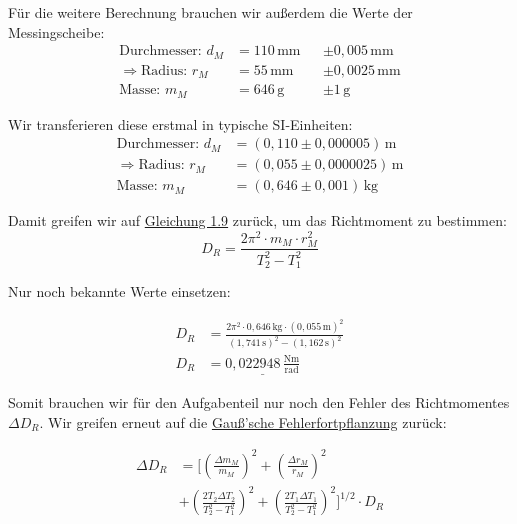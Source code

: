 Für die weitere Berechnung brauchen wir außerdem die Werte der Messingscheibe:
\begin{align*}
    \text{Durchmesser: }         d_M   &= 110\,\mathrm{mm}    &&\pm 0,005\,\mathrm{mm} \\
    \Rightarrow \text{Radius: }  r_M   &= 55\,\mathrm{mm}     &&\pm 0,0025\,\mathrm{mm} \\
    \text{Masse: }               m_M   &= 646\,\mathrm{g}     &&\pm 1\,\mathrm{g}
\end{align*}

Wir transferieren diese erstmal in typische SI-Einheiten:
\begin{align*}
    \text{Durchmesser: }         d_M   &= (0,110 \pm 0,000005)\,\mathrm{m} \\
    \Rightarrow \text{Radius: }  r_M   &= (0,055  \pm 0,0000025)\,\mathrm{m} \\
    \text{Masse: }               m_M   &= (0,646 \pm 0,001)\,\mathrm{kg}
\end{align*}

Damit greifen wir auf \hyperref[eq:richtmoment_rechnen]{Gleichung 1.9} zurück, um das Richtmoment zu bestimmen:
\begin{equation}
    D_R = \frac{2\pi^2 \cdot m_M \cdot r_M^2}{T_2^2-T_1^2}
\end{equation}

Nur noch bekannte Werte einsetzen:

\begin{align}
    D_R &= \frac{2\pi^2 \cdot 0,646\,\mathrm{kg} \cdot (0,055\,\mathrm{m})^2}{(1,741\,\mathrm{s})^2-(1,162\,\mathrm{s})^2} \\
    D_R &= \underline{0,022948 \,\mathrm{\frac{Nm}{rad}}}
    \label{eq:richtmoment_berechnet}
\end{align}

Somit brauchen wir für den Aufgabenteil nur noch den Fehler des Richtmomentes $\Delta D_R$. Wir greifen erneut auf die \hyperref[eq:gauss_fehlfortpflanzung]{Gauß'sche Fehlerfortpflanzung} zurück:

\begin{equation}
    \begin{split}
    \Delta D_R &= \Bigg[ 
    \left(\frac{\Delta m_M}{m_M}\right)^2 + 
    \left(\frac{\Delta r_M}{r_M}\right)^2 \\[6pt]
    &+ \left(\frac{2T_2 \Delta T_2}{T_2^2-T_1^2}\right)^2 
    + \left(\frac{2T_1 \Delta T_1}{T_2^2-T_1^2}\right)^2
    \Bigg]^{1/2} \cdot D_R
    \end{split}
\end{equation}


